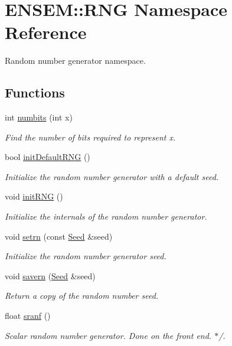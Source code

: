 \hypertarget{namespaceENSEM_1_1RNG}{}\section{E\+N\+S\+EM\+:\+:R\+NG Namespace Reference}
\label{namespaceENSEM_1_1RNG}


Random number generator namespace.  


\subsection*{Functions}
\begin{DoxyCompactItemize}
\item 
int \mbox{\hyperlink{namespaceENSEM_1_1RNG_aa1f3f43467faf807cee97333f92173d4}{numbits}} (int x)
\begin{DoxyCompactList}\small\item\em Find the number of bits required to represent x. \end{DoxyCompactList}\item 
bool \mbox{\hyperlink{namespaceENSEM_1_1RNG_a4a7ec2d430ab092440b9c3b2b5fd9e64}{init\+Default\+R\+NG}} ()
\begin{DoxyCompactList}\small\item\em Initialize the random number generator with a default seed. \end{DoxyCompactList}\item 
void \mbox{\hyperlink{namespaceENSEM_1_1RNG_a69ee665fc3157b2080c75a027343d449}{init\+R\+NG}} ()
\begin{DoxyCompactList}\small\item\em Initialize the internals of the random number generator. \end{DoxyCompactList}\item 
void \mbox{\hyperlink{namespaceENSEM_1_1RNG_ad0ec5508fb072a32d96927e5b752164a}{setrn}} (const \mbox{\hyperlink{group__defs_ga8a5a983ab64ca8f6a5419885bacd4c40}{Seed}} \&seed)
\begin{DoxyCompactList}\small\item\em Initialize the random number generator seed. \end{DoxyCompactList}\item 
void \mbox{\hyperlink{namespaceENSEM_1_1RNG_a5e6a21d205da8a5f8bf3c4732ab5d358}{savern}} (\mbox{\hyperlink{group__defs_ga8a5a983ab64ca8f6a5419885bacd4c40}{Seed}} \&seed)
\begin{DoxyCompactList}\small\item\em Return a copy of the random number seed. \end{DoxyCompactList}\item 
float \mbox{\hyperlink{namespaceENSEM_1_1RNG_a169ccd1627df1ad9983c4ce344d0e36a}{sranf}} ()
\begin{DoxyCompactList}\small\item\em Scalar random number generator. Done on the front end. $\ast$/. \end{DoxyCompactList}\end{DoxyCompactItemize}
